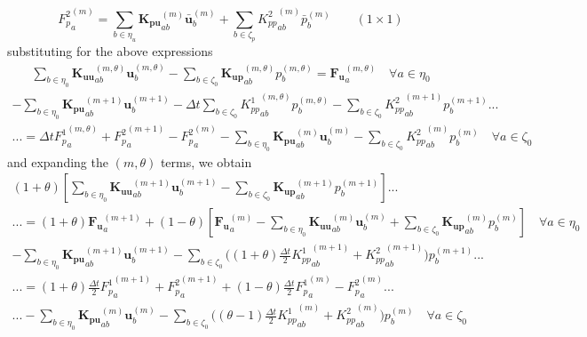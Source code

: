\documentclass[11pt]{article} %
\begin{document}
\begin{equation}
	{F^2_{p}}_{a}^{(m)} = \sum_{b \in \eta_u} \mathbf{K_{pu}}_{ab}^{(m)} \bar{\mathbf{u}}_b^{(m)} + \sum_{b \in \zeta_p} {K^2_{pp}}_{ab}^{(m)} \bar{p}_b^{(m)} \qquad ( 1 \times 1 )
\end{equation}
substituting for the above expressions
\begin{eqnarray}
	 \sum_{b \in \eta_0} \mathbf{K_{uu}}_{ab}^{(m,\theta)} \mathbf{u}_b^{(m,\theta)} - \sum_{b \in \zeta_0} \mathbf{K_{up}}_{ab}^{(m,\theta)} p_b^{(m,\theta)} = \mathbf{F_{u}}_{a}^{(m,\theta)} \quad \forall a \in \eta_0
\end{eqnarray}
\begin{eqnarray}
	 - \sum_{b \in \eta_0} \mathbf{K_{pu}}_{ab}^{(m+1)} \mathbf{u}_b^{(m+1)} - \Delta t \sum_{b \in \zeta_0} {K^1_{pp}}_{ab}^{(m, \theta)} p_b^{(m,\theta)} - \sum_{b \in \zeta_0} {K^2_{pp}}_{ab}^{(m+1)} p_b^{(m+1)}  ... \nonumber \\
	... = \Delta t {F^1_{p}}_{a}^{(m,\theta)} + {F^2_{p}}_{a}^{(m+1)} - {F^2_{p}}_{a}^{(m)} - \sum_{b \in \eta_0} \mathbf{K_{pu}}_{ab}^{(m)} \mathbf{u}_b^{(m)} - \sum_{b \in \zeta_0} {K^2_{pp}}_{ab}^{(m)} p_b^{(m)} \quad \forall a \in \zeta_0
\end{eqnarray}
and expanding the $(m,\theta)$ terms, we obtain
\begin{eqnarray}
	(1+\theta) \left[ \sum_{b \in \eta_0} \mathbf{K_{uu}}_{ab}^{(m+1)} \mathbf{u}_b^{(m+1)} - \sum_{b \in \zeta_0} \mathbf{K_{up}}_{ab}^{(m+1)} p_b^{(m+1)} \right] ... \qquad \qquad \nonumber \\
	... = (1+\theta) \mathbf{F_{u}}_{a}^{(m+1)} + (1-\theta) \left[ \mathbf{F_{u}}_{a}^{(m)} - \sum_{b \in \eta_0} \mathbf{K_{uu}}_{ab}^{(m)} \mathbf{u}_b^{(m)} + \sum_{b \in \zeta_0} \mathbf{K_{up}}_{ab}^{(m)} p_b^{(m)} \right] \quad \forall a \in \eta_0
\end{eqnarray}
\newline
\begin{eqnarray}
	 - \sum_{b \in \eta_0} \mathbf{K_{pu}}_{ab}^{(m+1)} \mathbf{u}_b^{(m+1)} - \sum_{b \in \zeta_0} \bigg( (1+\theta) \frac{\Delta t}{2} {K^1_{pp}}_{ab}^{(m+1)} + {K^2_{pp}}_{ab}^{(m+1)} \bigg) p_b^{(m+1)}  ... \nonumber \\
	... = (1+\theta) \frac{\Delta t}{2} {F^1_{p}}_{a}^{(m+1)} + {F^2_{p}}_{a}^{(m+1)} + (1-\theta) \frac{\Delta t}{2} {F^1_{p}}_{a}^{(m)} - {F^2_{p}}_{a}^{(m)} ... \nonumber \\
	... - \sum_{b \in \eta_0} \mathbf{K_{pu}}_{ab}^{(m)} \mathbf{u}_b^{(m)} - \sum_{b \in \zeta_0} \bigg( (\theta-1) \frac{\Delta t}{2} {K^1_{pp}}_{ab}^{(m)} + {K^2_{pp}}_{ab}^{(m)} \bigg) p_b^{(m)} \quad \forall a \in \zeta_0
\end{eqnarray}
\end{document}

